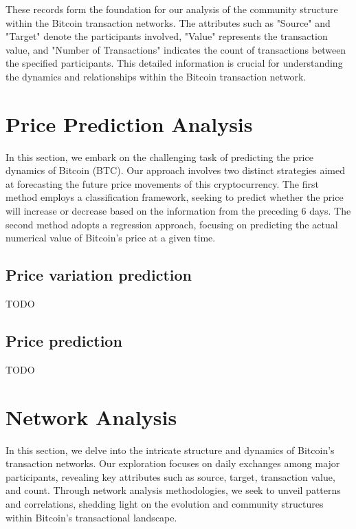 \documentclass[a4paper, 12pt]{article}
\begin{document}
These records form the foundation for our analysis of the community structure within the Bitcoin transaction networks. The attributes such as "Source" and "Target" denote the participants involved, "Value" represents the transaction value, and "Number of Transactions" indicates the count of transactions between the specified participants. This detailed information is crucial for understanding the dynamics and relationships within the Bitcoin transaction network.

\newpage

\section{Price Prediction Analysis}

In this section, we embark on the challenging task of predicting the price dynamics of Bitcoin (BTC). Our approach involves two distinct strategies aimed at forecasting the future price movements of this cryptocurrency. The first method employs a classification framework, seeking to predict whether the price will increase or decrease based on the information from the preceding 6 days. The second method adopts a regression approach, focusing on predicting the actual numerical value of Bitcoin's price at a given time.

\subsection{Price variation prediction}
TODO

\subsection{Price prediction}
TODO

\section{Network Analysis}
In this section, we delve into the intricate structure and dynamics of Bitcoin's transaction networks. Our exploration focuses on daily exchanges among major participants, revealing key attributes such as source, target, transaction value, and count. Through network analysis methodologies, we seek to unveil patterns and correlations, shedding light on the evolution and community structures within Bitcoin's transactional landscape.
\end{document}
